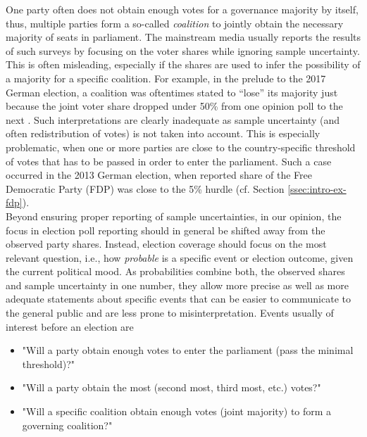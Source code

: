 \documentclass[smallcondensed]{svjour3}     %
\begin{document}
One party often does not obtain enough votes for a governance majority by itself,
thus, multiple parties form a so-called \emph{coalition} to jointly obtain the
necessary majority of seats in parliament.
The mainstream media usually reports the results of such surveys by focusing
on the voter shares while ignoring sample uncertainty. This is often misleading,
especially if the shares are used to infer the possibility of a majority for
a specific coalition. For example, in the prelude to the 2017 German election,
a coalition was oftentimes stated to ``lose'' its majority just because the joint
voter share dropped under 50\% from one opinion poll to the next \citep[cf.][]{umfrage_2017}.
Such interpretations are clearly inadequate as sample uncertainty
(and often redistribution of votes) is not taken into account. This is especially
problematic, when one or more parties are close to the country-specific threshold
of votes that has to be passed in order to enter the parliament. Such a case
occurred in the 2013 German election, when reported share of the Free Democratic
Party (FDP) was close to the 5\% hurdle (cf. Section \ref{ssec:intro-ex-fdp}).\\


Beyond ensuring proper reporting of sample uncertainties, in our opinion, the
focus in election poll reporting should in general be shifted away from the
observed party shares. Instead, election coverage should focus on the most relevant
question, i.e., how {\it probable} is a specific event or election outcome, given
the current political mood.
As probabilities combine both, the observed shares and sample uncertainty in one
number, they allow more precise as well as more adequate statements about specific
events that can be easier to communicate to the general public and are
less prone to misinterpretation.
Events usually of interest before an election are
\begin{itemize}
  \item  "Will a party obtain enough votes to enter the parliament (pass the minimal threshold)?"
  \item  "Will a party obtain the most (second most, third most, etc.) votes?"
  \item "Will a specific coalition obtain enough votes (joint majority) to form a governing coalition?"
\end{itemize}
\end{document}
